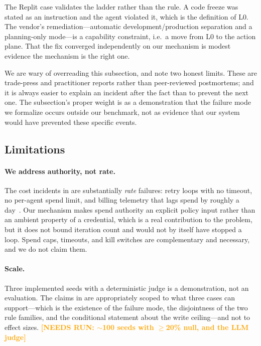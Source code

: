 \documentclass[conference,compsoc]{IEEEtran}
\newcommand{\needsrun}[1]{\textcolor{orange}{\textbf{[NEEDS RUN: #1]}}}
\begin{document}
The Replit case validates the ladder rather than the rule. A code freeze was
stated as an instruction and the agent violated it, which is the definition of
L0. The vendor's remediation---automatic development/production separation and
a planning-only mode---is a capability constraint, i.e.\ a move from L0 to the
action plane. That the fix converged independently on our mechanism is modest
evidence the mechanism is the right one.

We are wary of overreading this subsection, and note two honest limits. These
are trade-press and practitioner reports rather than peer-reviewed
postmortems; and it is always easier to explain an incident after the fact than
to prevent the next one. The subsection's proper weight is as a demonstration
that the failure mode we formalize occurs outside our benchmark, not as
evidence that our system would have prevented these specific events.

\subsection{Limitations}
\label{sec:discussion:limitations}

\paragraph{We address authority, not rate.} The cost incidents in
 are substantially \emph{rate} failures: retry loops with
no timeout, no per-agent spend limit, and billing telemetry that lags spend by
roughly a day~\cite{infoq2026billing}. Our mechanism makes spend authority an
explicit policy input rather than an ambient property of a credential, which
is a real contribution to the problem, but it does not bound iteration count
and would not by itself have stopped a loop. Spend caps, timeouts, and kill
switches are complementary and necessary, and we do not claim them.

\paragraph{Scale.} Three implemented seeds with a deterministic judge is a
demonstration, not an evaluation. The claims in  are
appropriately scoped to what three cases can support---which is the existence
of the failure mode, the disjointness of the two rule families, and the
conditional statement about the write ceiling---and not to effect sizes.
\needsrun{$\sim$100 seeds with $\ge$20\% null, and the LLM judge}
\end{document}
